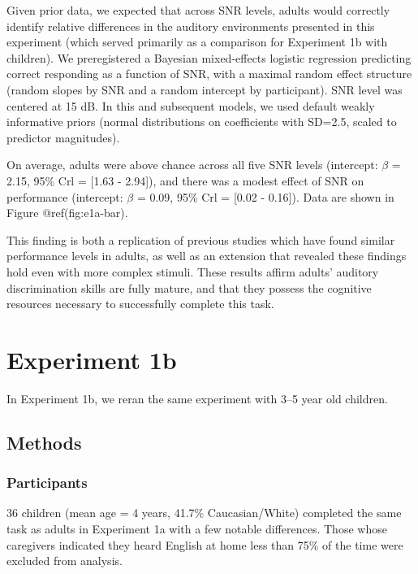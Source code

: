 \documentclass[10pt, letterpaper]{article}
\begin{document}
Given prior data, we expected that across SNR levels, adults would
correctly identify relative differences in the auditory environments
presented in this experiment (which served primarily as a comparison for
Experiment 1b with children). We preregistered a Bayesian mixed-effects
logistic regression predicting correct responding as a function of SNR,
with a maximal random effect structure (random slopes by SNR and a
random intercept by participant). SNR level was centered at 15 dB. In
this and subsequent models, we used default weakly informative priors
(normal distributions on coefficients with SD=2.5, scaled to predictor
magnitudes).

On average, adults were above chance across all five SNR levels
(intercept: \(\beta\) = 2.15, 95\% Crl = {[}1.63 - 2.94{]}), and there
was a modest effect of SNR on performance (intercept: \(\beta\) = 0.09,
95\% Crl = {[}0.02 - 0.16{]}). Data are shown in Figure
@ref(fig:e1a-bar).

This finding is both a replication of previous studies which have found
similar performance levels in adults, as well as an extension that
revealed these findings hold even with more complex stimuli. These
results affirm adults' auditory discrimination skills are fully mature,
and that they possess the cognitive resources necessary to successfully
complete this task.

\hypertarget{experiment-1b}{%
\section{Experiment 1b}\label{experiment-1b}}

In Experiment 1b, we reran the same experiment with 3--5 year old
children.

\hypertarget{methods-1}{%
\subsection{Methods}\label{methods-1}}

\hypertarget{participants-1}{%
\subsubsection{Participants}\label{participants-1}}

36 children (mean age = 4 years, 41.7\% Caucasian/White) completed the
same task as adults in Experiment 1a with a few notable differences.
Those whose caregivers indicated they heard English at home less than
75\% of the time were excluded from analysis.
\end{document}
